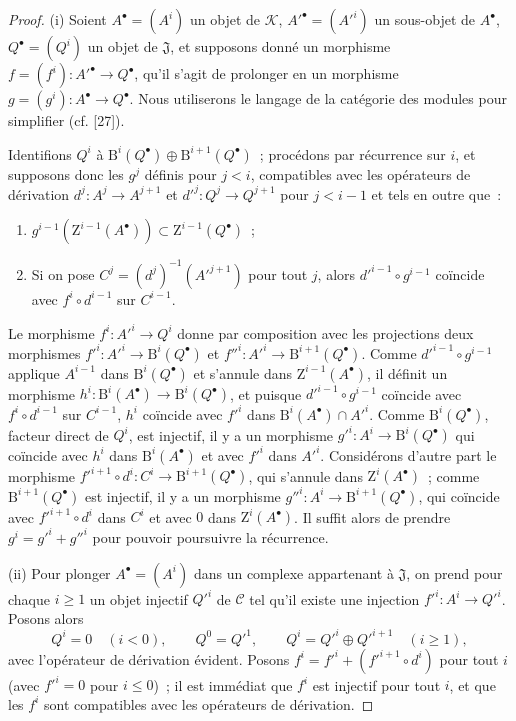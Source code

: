 \begin{proof}
\textup{(i)} Soient $A^\bullet=(A^i)$ un objet de $\mathcal K$,
$A'^\bullet=(A'^i)$ un sous-objet de $A^\bullet$,
$Q^\bullet=(Q^i)$ un objet de $\mathfrak J$, et supposons donné un morphisme
$f=(f^i):A'^\bullet\to Q^\bullet$, qu'il s'agit de prolonger en un morphisme
$g=(g^i):A^\bullet\to Q^\bullet$. Nous utiliserons le langage de la catégorie
des modules pour simplifier (cf. [27]).

Identifions $Q^i$ à
$\mathrm B^i(Q^\bullet)\oplus\mathrm B^{i+1}(Q^\bullet)$~; procédons par
récurrence sur $i$, et supposons donc les $g^j$ définis pour $j<i$,
compatibles avec les opérateurs de dérivation $d^j:A^j\to A^{j+1}$ et
$d'^j:Q^j\to Q^{j+1}$ pour $j<i-1$ et tels en outre que~:
\begin{enumerate}
  \item[$1^\circ$] $g^{i-1}(\mathrm Z^{i-1}(A^\bullet))\subset
    \mathrm Z^{i-1}(Q^\bullet)$~;
  \item[$2^\circ$] Si on pose $C^j=(d^j)^{-1}(A'^{j+1})$ pour tout $j$, alors
    $d'^{i-1}\circ g^{i-1}$ coïncide avec $f^i\circ d^{i-1}$ sur $C^{i-1}$.
\end{enumerate}
Le morphisme $f^i:A'^i\to Q^i$ donne par composition avec les projections
deux morphismes
$f'^i:A'^i\to\mathrm B^i(Q^\bullet)$ et
$f''^i:A'^i\to\mathrm B^{i+1}(Q^\bullet)$. Comme
$d'^{i-1}\circ g^{i-1}$ applique $A^{i-1}$ dans
$\mathrm B^i(Q^\bullet)$ et s'annule dans $\mathrm Z^{i-1}(A^\bullet)$, il
définit un morphisme
$h^i:\mathrm B^i(A^\bullet)\to\mathrm B^i(Q^\bullet)$, et puisque
$d'^{i-1}\circ g^{i-1}$ coïncide avec $f^i\circ d^{i-1}$ sur $C^{i-1}$,
$h^i$ coïncide avec $f'^i$ dans
$\mathrm B^i(A^\bullet)\cap A'^i$. Comme $\mathrm B^i(Q^\bullet)$, facteur
direct de $Q^i$, est injectif, il y a un morphisme
$g'^i:A^i\to\mathrm B^i(Q^\bullet)$ qui coïncide avec $h^i$ dans
$\mathrm B^i(A^\bullet)$ et avec $f'^i$ dans $A'^i$. Considérons d'autre part
le morphisme
$f'^{i+1}\circ d^i:C^i\to\mathrm B^{i+1}(Q^\bullet)$, qui s'annule dans
$\mathrm Z^i(A^\bullet)$~; comme $\mathrm B^{i+1}(Q^\bullet)$ est injectif,
il y a un morphisme $g''^i:A^i\to\mathrm B^{i+1}(Q^\bullet)$, qui coïncide
avec $f'^{i+1}\circ d^i$ dans $C^i$ et avec $0$ dans
$\mathrm Z^i(A^\bullet)$. Il suffit alors de prendre $g^i=g'^i+g''^i$ pour
pouvoir poursuivre la récurrence.

\textup{(ii)} Pour plonger $A^\bullet=(A^i)$ dans un complexe appartenant à
$\mathfrak J$, on prend pour chaque $i\geq1$ un objet injectif $Q'^i$ de
$\mathcal C$ tel qu'il existe une injection $f'^i:A^i\to Q'^i$. Posons alors
\[
  Q^i=0\quad(i<0),\qquad Q^0=Q'^1,\qquad
  Q^i=Q'^i\oplus Q'^{i+1}\quad(i\geq1),
\]
avec l'opérateur de dérivation évident. Posons
$f^i=f'^i+(f'^{i+1}\circ d^i)$ pour tout $i$ (avec $f'^i=0$ pour $i\leq0$)~;
il est immédiat que $f^i$ est injectif pour tout $i$, et que les $f^i$ sont
compatibles avec les opérateurs de dérivation.
\end{proof}

